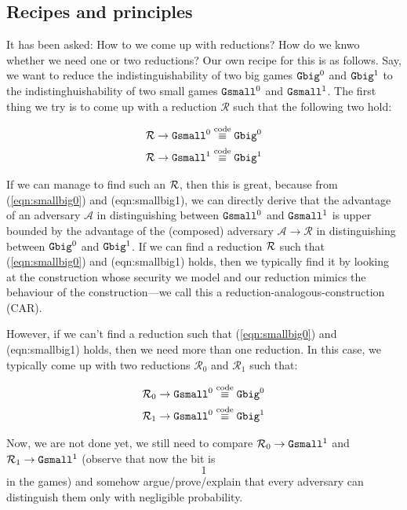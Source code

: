 
\subsection{Recipes and principles}
It has been asked: How to we come up with reductions? How do we knwo whether we need one or two reductions? Our own recipe for this is as follows. Say, we want to reduce the indistinguishability of two big games $\text{\texttt{Gbig}}^0$ and $\text{\texttt{Gbig}}^1$ to the indistinghuishability of two small games $\text{\texttt{Gsmall}}^0$ and $\text{\texttt{Gsmall}}^1$. The first thing we try is to come up with a reduction $\mathcal{R}$ such that the following two hold:

\begin{align}
\label{eqn:smallbig0}&\mathcal{R}\rightarrow\text{\texttt{Gsmall}}^0\stackrel{\text{code}}{\equiv}\text{\texttt{Gbig}}^0\\
\label{eqn:smallbig1}&\mathcal{R}\rightarrow\text{\texttt{Gsmall}}^1\stackrel{\text{code}}{\equiv}\text{\texttt{Gbig}}^1
\end{align}

If we can manage to find such an $\mathcal{R}$, then this is great, because from (\ref{eqn:smallbig0}) and (eqn:smallbig1), we can directly derive that the advantage of an adversary $\mathcal{A}$ in distinguishing between $\text{\texttt{Gsmall}}^0$ and $\text{\texttt{Gsmall}}^1$ is upper bounded by the advantage of the (composed) adversary $\mathcal{A}\rightarrow\mathcal{R}$ in distinguishing between $\text{\texttt{Gbig}}^0$ and $\text{\texttt{Gbig}}^1$. If we can find a reduction $\mathcal{R}$ such that (\ref{eqn:smallbig0}) and (eqn:smallbig1) holds, then we typically find it by looking at the construction whose security we model and our reduction mimics the behaviour of the construction---we call this a reduction-analogous-construction (CAR).

However, if we can't find a reduction such that  (\ref{eqn:smallbig0}) and (eqn:smallbig1) holds, then we need more than one reduction. In this case, we typically come up with two reductions $\mathcal{R}_0$ and $\mathcal{R}_1$ such that:

\begin{align}
\label{eqn:smallbig00}&\mathcal{R}_0\rightarrow\text{\texttt{Gsmall}}^0\stackrel{\text{code}}{\equiv}\text{\texttt{Gbig}}^0\\
\label{eqn:smallbig11}&\mathcal{R}_1\rightarrow\text{\texttt{Gsmall}}^0\stackrel{\text{code}}{\equiv}\text{\texttt{Gbig}}^1
\end{align}

Now, we are not done yet, we still need to compare $\mathcal{R}_0\rightarrow\text{\texttt{Gsmall}}^1$ and $\mathcal{R}_1\rightarrow\text{\texttt{Gsmall}}^1$ (observe that now the bit is $$1$$ in the games) and somehow argue/prove/explain that every adversary can distinguish them only with negligible probability.